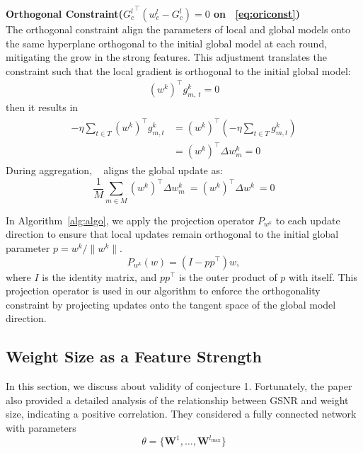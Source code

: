 \documentclass{article}
\theoremstyle{plain}
\theoremstyle{definition}
\theoremstyle{remark}
\begin{document}
\textbf{Orthogonal Constraint(${G_c^l}^\top (w_c^l - G_c^l)=0$ on ~\cref{eq:oriconst})}\\ 
The orthogonal constraint align the parameters of local and global models onto the same hyperplane orthogonal to the initial global model at each round, mitigating the grow in the strong features. This adjustment translates the constraint such that the local gradient is orthogonal to the initial global model:
\begin{gather}
(w^k)^\top g_{m,\ t}^k = 0 \label{eq:const2}
\end{gather}
then it results in
\begin{gather}
\begin{split}
-\eta \sum_{t \in T} (w^k)^\top g_{m,t}^k &= (w^k)^\top (-\eta \sum_{t \in T} g_{m,t}^k) \\ &= (w^k)^\top \Delta w_{m}^k = 0 \label{eq:orthresult}
\end{split}
\end{gather}
During aggregation, ~ aligns the global update as:
\begin{equation}
\frac{1}{M}\sum _{m\in M}^{\ }(w^k)^\top \Delta w_m^k\ =  (w^k)^\top \Delta w^k\ = 0
\label{eq:centg}
\end{equation}

In Algorithm~\ref{alg:algo}, we apply the projection operator \( P_{w^k} \) to each update direction to ensure that local updates remain orthogonal to the initial global parameter \( p = w^k / \| w^k \| \).
\begin{equation}
    P_{w^k}(w) = (I - pp^\top)w,
    \label{eq:projection}
\end{equation}
where \( I \) is the identity matrix, and \( pp^\top \) is the outer product of \( p \) with itself. This projection operator is used in our algorithm to enforce the orthogonality constraint by projecting updates onto the tangent space of the global model direction.


\subsection{Weight Size as a Feature Strength}
In this section, we discuss about validity of conjecture 1. Fortunately, the paper \cite{understanding} also provided a detailed analysis of the relationship between GSNR and weight size, indicating a positive correlation. They considered a fully connected network with parameters 
\begin{equation}
\theta = \{ \bm{W}^{1}, \ldots, \bm{W}^{l_{\mathrm{max}}} \}
\end{equation}
\end{document}
